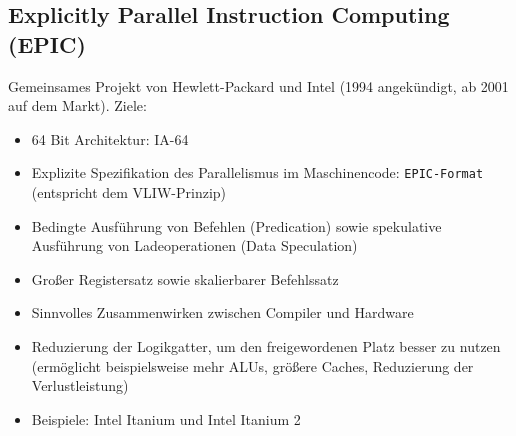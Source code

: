 \subsection{Explicitly Parallel Instruction Computing (EPIC)}
Gemeinsames Projekt von Hewlett-Packard und Intel (1994 angekündigt, ab 2001 auf dem Markt). Ziele:
\begin{itemize}
	\item 64 Bit Architektur: IA-64
	\item Explizite Spezifikation des Parallelismus im Maschinencode: \texttt{EPIC-Format} (entspricht dem VLIW-Prinzip)
	\item Bedingte Ausführung von Befehlen (Predication) sowie spekulative Ausführung von Ladeoperationen (Data Speculation)
	\item Großer Registersatz sowie skalierbarer Befehlssatz
	\item Sinnvolles Zusammenwirken zwischen Compiler und Hardware
	\item Reduzierung der Logikgatter, um den freigewordenen Platz besser zu nutzen (ermöglicht beispielsweise mehr ALUs, größere Caches, Reduzierung der Verlustleistung)
	\item Beispiele: Intel Itanium und Intel Itanium 2
\end{itemize}


